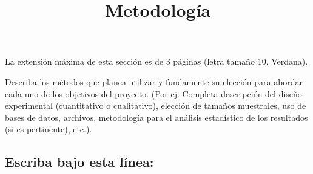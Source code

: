 \documentclass[10pt,prl]{revtex4}
\begin{document}
\title{Metodolog\'ia}
\maketitle

La extensi\'on m\'axima de esta secci\'on es de 3 p\'aginas (letra tama\~no 10, Verdana).

Describa los m\'etodos que planea utilizar y fundamente su elecci\'on para abordar cada uno de los objetivos del proyecto. (Por ej. Completa descripci\'on del dise\~no experimental (cuantitativo o cualitativo), elecci\'on de tama\~nos muestrales, uso de bases de datos, archivos, metodolog\'ia para el an\'alisis estad\'istico de los resultados (si es pertinente), etc.).

\maketitle
\subsection{Escriba bajo esta l\'inea:}
\end{document}

